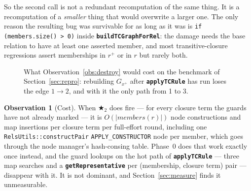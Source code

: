 \documentclass[11pt,a4paper]{article}
\newcommand{\code}[1]{\texttt{\small #1}}
\newcommand{\fn}[1]{\texttt{\small\bfseries #1}}
\newcommand{\tup}[1]{\langle #1 \rangle}
\newcommand{\tc}[1]{{#1}^{+}}
\theoremstyle{definition}
\newtheorem{observation}{Observation}
\begin{document}
\noindent
So the second call is not a redundant recomputation of the same thing. It is a
recomputation of a \emph{smaller} thing that would overwrite a larger one. The
only reason the resulting bug was survivable for as long as it was is
\code{if (members.size() > 0)} inside \fn{buildTCGraphForRel}: the damage needs
the base relation to have at least one asserted member, and most
transitive-closure regressions assert memberships in $\tc{r}$ or in $r$ but
rarely both.

\begin{figure}[h]\centering
{}
\caption{What Observation~\ref{obs:destroy} would cost on the benchmark of
Section~\ref{sec:repro}: rebuilding $G_{\tc{x}}$ after \fn{applyTCRule} has run
loses the edge $1\to2$, and with it the only path from 1 to 3.}
\end{figure}

\begin{observation}[Cost]
When $\bigstar_2$ does fire --- for every closure term the guards have not
already marked --- it is $O(|\mathit{members}(r)|)$ node constructions and map
insertions per closure term per full-effort round, including one
\code{RelsUtils::constructPair} \code{APPLY\_CONSTRUCTOR} node per member, which
goes through the node manager's hash-consing table. Phase~0 does that work
exactly once instead, and the guard lookups on the hot path of
\fn{applyTCRule} --- three map searches and a \fn{getRepresentative} per
(membership, closure term) pair --- disappear with it. It is not dominant, and
Section~\ref{sec:measure} finds it unmeasurable.
\end{observation}
\end{document}
